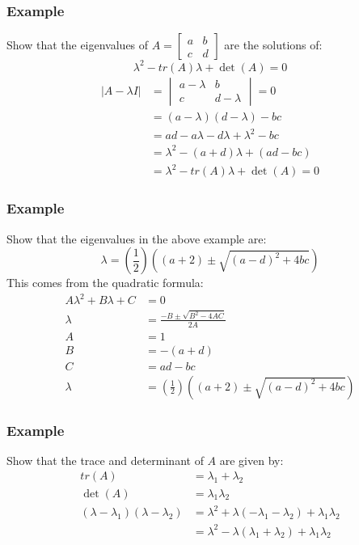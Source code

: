 \documentclass[letterpaper, 12pt]{math}
\begin{document}
\subsubsection*{Example}
Show that the eigenvalues of \( A = \begin{bmatrix}a & b \\ c & d\end{bmatrix}
\) are the solutions of:
\[ \lambda^2-tr(A)\lambda+\det(A) = 0 \]
\begin{align*}
  |A-\lambda I| &= \begin{vmatrix}
    a-\lambda & b \\
    c & d-\lambda
  \end{vmatrix}  = 0 \\
  &= (a-\lambda)(d-\lambda)-bc \\
  &= ad-a\lambda-d\lambda+\lambda^2-bc \\
  &= \lambda^2-(a+d)\lambda+(ad-bc) \\
  &= \lambda^2-tr(A)\lambda+\det(A) = 0
\end{align*}

\subsubsection*{Example}
Show that the eigenvalues in the above example are:
\[ \lambda = (\frac{1}{2})((a+2)\pm\sqrt{(a-d)^2+4bc}) \]
This comes from the quadratic formula:
\begin{align*}
  A\lambda^2+B\lambda+C &= 0 \\
  \lambda &= \frac{-B\pm\sqrt{B^2-4AC}}{2A} \\
  A &= 1 \\
  B &= -(a+d) \\
  C &= ad-bc \\
  \lambda &= (\frac{1}{2})((a+2)\pm\sqrt{(a-d)^2+4bc})
\end{align*}

\subsubsection*{Example}
Show that the trace and determinant of \( A \) are given by:
\begin{align*}
  tr(A) &= \lambda_1+\lambda_2 \\
  \det(A) &= \lambda_1\lambda_2 \\
  (\lambda-\lambda_1)(\lambda-\lambda_2) &=
    \lambda^2+\lambda(-\lambda_1-\lambda_2)+\lambda_1\lambda_2 \\
  &= \lambda^2-\lambda(\lambda_1+\lambda_2)+\lambda_1\lambda_2
\end{align*}
\end{document}
